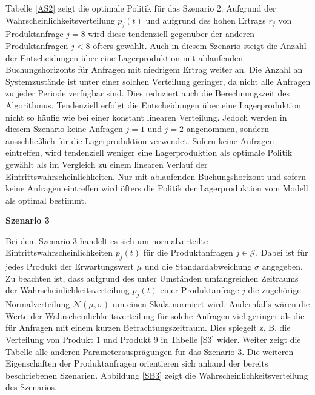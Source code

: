 Tabelle \ref{AS2} zeigt die optimale Politik für das Szenario 2. Aufgrund der Wahrscheinlichkeitsverteilung $p_j(t)$ und aufgrund des hohen Ertrags $r_j$ von Produktanfrage $j=8$ wird diese tendenziell gegenüber der anderen Produktanfragen $j<8$ öfters gewählt. Auch in diesem Szenario steigt die Anzahl der Entscheidungen über eine Lagerproduktion mit ablaufenden Buchungshorizonts für Anfragen mit niedrigem Ertrag weiter an. Die Anzahl an Systemzustände ist unter einer solchen Verteilung geringer, da nicht alle Anfragen zu jeder Periode verfügbar sind. Dies reduziert auch die Berechnungszeit des Algorithmus. Tendenziell erfolgt die Entscheidungen über eine Lagerproduktion nicht so häufig wie bei einer konstant linearen Verteilung. Jedoch werden in diesem Szenario keine Anfragen $j=1$ und $j=2$ angenommen, sondern ausschließlich für die Lagerproduktion verwendet. Sofern keine Anfragen eintreffen, wird tendenziell weniger eine Lagerproduktion als optimale Politik gewählt als im Vergleich zu einem linearen Verlauf der Eintrittswahrscheinlichkeiten. Nur mit ablaufenden Buchungshorizont und sofern keine Anfragen eintreffen wird öfters die Politik der Lagerproduktion vom Modell als optimal bestimmt.

\textbf{Szenario 3}

Bei dem Szenario 3 handelt es sich um normalverteilte Eintrittswahrscheinlichkeiten $p_j(t)$ für die Produktanfragen $j\in\mathcal{J}$. Dabei ist für jedes Produkt der Erwartungswert $\mu$ und die Standardabweichung $\sigma$ angegeben. Zu beachten ist, dass aufgrund des unter Umständen umfangreichen Zeitraums der Wahrscheinlichkeitsverteilung $p_j(t)$ einer Produktanfrage $j$ die zugehörige Normalverteilung $\mathcal{N}(\mu,\sigma)$ um einen Skala normiert wird. Andernfalls wären die Werte der Wahrscheinlichkeitsverteilung für solche Anfragen viel geringer als die für Anfragen mit einem kurzen Betrachtungszeitraum. Dies spiegelt z. B. die Verteilung von Produkt 1 und Produkt 9 in Tabelle \ref{S3} wider. Weiter zeigt die Tabelle alle anderen Parameterausprägungen für das Szenario 3. Die weiteren Eigenschaften der Produktanfragen orientieren sich anhand der bereits beschriebenen Szenarien. Abbildung \ref{SB3} zeigt die Wahrscheinlichkeitsverteilung des Szenarios.

